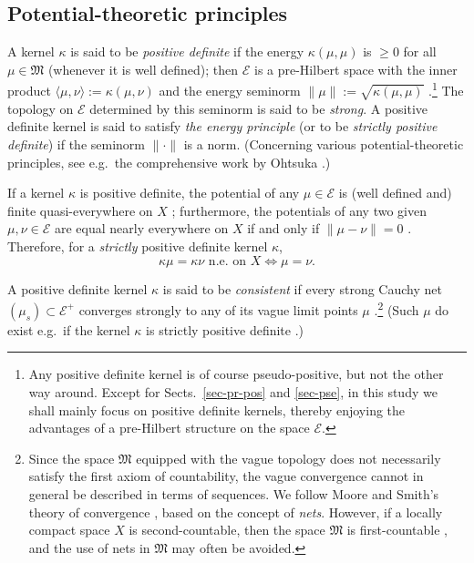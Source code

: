 \documentclass[12pt,a4paper,reqno]{amsart} %
\theoremstyle{lause}
\theoremstyle{maaritelma}
\theoremstyle{lause}
\theoremstyle{maaritelma}
\numberwithin{equation}{section}
\begin{document}
\subsection{Potential-theoretic principles}\label{subs-pr}
A kernel $\kappa$ is said to be {\it positive definite\/} if the energy $\kappa(\mu,\mu)$ is ${}\geqslant0$ for all $\mu\in\mathfrak M$ (whenever it is well defined); then $\mathcal E$ is a pre-Hil\-bert space with the inner product $\langle\mu,\nu\rangle:=\kappa(\mu,\nu)$ and the energy seminorm $\|\mu\|:=\sqrt{\kappa(\mu,\mu)}$ \cite[Section~3.1]{F1}.\footnote{Any positive definite kernel is of course  pseudo-positive, but not the other way around. Except for Sects.~\ref{sec-pr-pos} and \ref{sec-pse}, in this study we shall mainly focus on positive definite kernels, thereby enjoying the advantages of a pre-Hilbert structure on the space $\mathcal E$.} The topology on $\mathcal E$ determined by this seminorm is said to be {\it strong}. A positive definite kernel is said to satisfy {\it the energy principle\/} (or to be {\it strictly positive definite\/}) if the seminorm $\|\cdot\|$ is a norm. (Concerning various poten\-tial-theore\-tic principles, see e.g.\ the comprehensive work by Ohtsuka \cite{O}.)

If a kernel $\kappa$ is positive definite, the potential of any $\mu\in\mathcal E$ is (well defined and) finite qua\-si-ev\-ery\-whe\-re on $X$ \cite[p.~165, Corollary]{F1}; furthermore, the potentials of any two given $\mu,\nu\in\mathcal E$ are equal nearly everywhere on $X$ if and only if $\|\mu-\nu\|=0$ \cite[Lemma~3.2.1]{F1}. Therefore, for a {\it strictly\/} positive definite kernel $\kappa$,
\begin{equation}\label{E}\kappa\mu=\kappa\nu\text{ \ n.e.\ on $X$}\iff\mu=\nu.\end{equation}

A positive definite kernel $\kappa$ is said to be {\it consistent\/} if every strong Cauchy net $(\mu_s)\subset\mathcal E^+$ converges strongly to any of its vague limit points $\mu$ \cite[Section~3.3]{F1}.\footnote{Since the space $\mathfrak M$ equipped with the vague topology does not necessarily satisfy the first axiom of countability, the vague convergence cannot in general be described in terms of sequences. We follow Moore and Smith's theory of convergence
\cite{MSm}, based on the concept of {\it nets}. However, if a locally compact space $X$ is sec\-ond-count\-able, then the space $\mathfrak M$ is first-count\-able \cite[Lemma~4.5]{Z-arx}, and the use of nets in $\mathfrak M$ may often be avoided.} (Such $\mu$ do exist e.g.\ if the kernel $\kappa$ is strictly positive definite \cite[Lemma~2.5.1]{F1}.)
\end{document}
